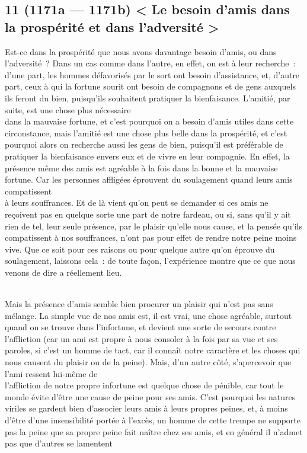 \documentclass[french,twoside]{book} %
\begin{document}
\subsection[{11 (1171a — 1171b) < Le besoin d’amis dans la prospérité et dans l’adversité >}]{11 (1171a — 1171b) < Le besoin d’amis dans la prospérité et dans l’adversité >}
\noindent Est-ce dans la prospérité que nous avons davantage besoin d’amis, ou dans l’adversité ? Dans un cas comme dans l’autre, en effet, on est à leur recherche : d’une part, les hommes défavorisés par le sort ont besoin d’assistance, et, d’autre part, ceux à qui la fortune sourit ont besoin de compagnons et de gens auxquels ils feront du bien, puisqu’ils souhaitent pratiquer la bienfaisance. L’amitié, par suite, est une chose plus nécessaire \\
dans la mauvaise fortune, et c’est pourquoi on a besoin d’amis utiles dans cette circonstance, mais l’amitié est une chose plus belle dans la prospérité, et c’est pourquoi alors on recherche aussi les gens de bien, puisqu’il est préférable de pratiquer la bienfaisance envers eux et de vivre en leur compagnie. En effet, la présence même des amis est agréable à la fois dans la bonne et la mauvaise fortune. Car les personnes affligées éprouvent du soulagement quand leurs amis compatissent \\
à leurs souffrances. Et de là vient qu’on peut se demander si ces amis ne reçoivent pas en quelque sorte une part de notre fardeau, ou si, sans qu’il y ait rien de tel, leur seule présence, par le plaisir qu’elle nous cause, et la pensée qu’ils compatissent à nos souffrances, n’ont pas pour effet de rendre notre peine moins vive. Que ce soit pour ces raisons ou pour quelque autre qu’on éprouve du soulagement, laissons cela : de toute façon, l’expérience montre que ce que nous venons de dire a réellement lieu.\par
\\
Mais la présence d’amis semble bien procurer un plaisir qui n’est pas sans mélange. La simple vue de nos amis est, il  est vrai, une chose agréable, surtout quand on se trouve dans l’infortune, et devient une sorte de secours contre l’affliction (car un ami est propre à nous consoler à la fois par sa vue et ses paroles, si c’est un homme de tact, car il connaît notre caractère et les choses qui nous causent du plaisir ou de la peine). Mais, d’un autre côté, s’apercevoir que l’ami ressent lui-même de \\
l’affliction de notre propre infortune est quelque chose de pénible, car tout le monde évite d’être une cause de peine pour ses amis. C’est pourquoi les natures viriles se gardent bien d’associer leurs amis à leurs propres peines, et, à moins d’être d’une insensibilité portée à l’excès, un homme de cette trempe ne supporte pas la peine que sa propre peine fait naître chez ses amis, et en général il n’admet pas que d’autres se lamentent \\
\end{document}
